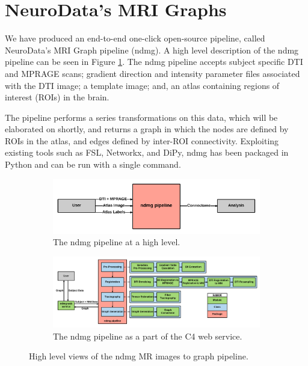 \section{NeuroData's MRI Graphs}
\label{sec:ndmg-over}
We have produced an end-to-end one-click open-source pipeline, called NeuroData's MRI Graph pipeline (ndmg). A high level description of the ndmg pipeline can be seen in Figure \ref{fig:ndmg-simple}. The ndmg pipeline accepts subject specific DTI and MPRAGE scans; gradient direction and intensity parameter files associated with the DTI image; a template image; and, an atlas containing regions of interest (ROIs) in the brain.

The pipeline performs a series transformations on this data, which will be elaborated on shortly, and returns a graph in which the nodes are defined by ROIs in the atlas, and edges defined by inter-ROI connectivity. Exploiting existing tools such as FSL, Networkx, and DiPy, ndmg has been packaged in Python and can be run with a single command.

\begin{figure}[h!]
\centering
\begin{subfigure}[h!]{0.8\textwidth}
\centering
\includegraphics[width=1\textwidth]{./figs/ndmg_simple_pastel.png}
\makeatletter
\let\@currsize\normalsize
\caption{The ndmg pipeline at a high level.}
\label{fig:ndmg-simple}
\end{subfigure}
\begin{subfigure}[h!]{\textwidth}
\centering
\includegraphics[width=1\textwidth]{./figs/ndmg_pipeline_pastel.png}
\makeatletter
\let\@currsize\normalsize
\caption{The ndmg pipeline as a part of the C4 web service.}
\label{fig:ndmg-pipeline}
\end{subfigure}
\makeatletter
\let\@currsize\normalsize
\caption{High level views of the ndmg MR images to graph pipeline.}
\end{figure}

